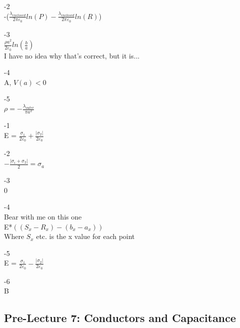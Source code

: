 \documentclass{article}
\begin{document}
\vspace{2mm}

-2 \\
-($\frac{\lambda_{enclosed}}{2 \pi \varepsilon_0} ln(P) - \frac{\lambda_{enclosed}}{2 \pi \varepsilon_0} ln(R)$) 

\vspace{2mm}


-3 \\
$\frac{\rho a^2}{2 \varepsilon_0} ln(\frac{b}{a})$ \\
I have no idea why that's correct, but it is...

\vspace{2mm}


-4 \\
A, $V(a) < 0$ \\
\vspace{2mm}


-5 \\
$\rho = -\frac{\lambda_{outer}}{\pi a^2}$

\vspace{2mm}

-1 \\
E = $\frac{\sigma_1}{2 \varepsilon_0} + \frac{|\sigma_2|}{2 \varepsilon_0}$
\vspace{2mm}

-2 \\
$-\frac{|\sigma_i + \sigma_2|}{2} = \sigma_a$

\vspace{2mm}

-3 \\
0

\vspace{2mm}

-4 \\
Bear with me on this one\\
E*$((S_x-R_x) - (b_x-a_x))$ \\
Where $S_x$ etc. is the x value for each point

\vspace{2mm}

-5 \\
E = $\frac{\sigma_1}{2 \varepsilon_0} - \frac{|\sigma_2|}{2 \varepsilon_0}$

\vspace{2mm}

-6 \\
B

\subsection{Pre-Lecture 7: Conductors and Capacitance}
\end{document}
